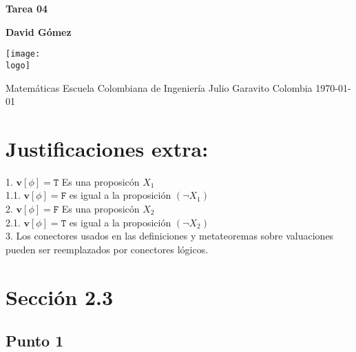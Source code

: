 \documentclass{article}
\newcommand{\logo}{C:/Users/usuario/Documents/U/logo-eci.jpg}
\newcommand{\val}[2]{\mathbf{#1}[#2]}
\begin{document}

\begin{titlepage}
	\begin{center}
		\vspace*{1cm}

		\textbf{\Huge{Tarea 04}}

		\vspace{1.5cm}

		\textbf{\large{David Gómez}}

		\vspace{4cm}

		\texttt{[image: \\logo]}

		\vspace{5cm}

		Matemáticas\linebreak
		Escuela Colombiana de Ingeniería Julio Garavito\linebreak
		Colombia\linebreak
		\today

	\end{center}
\end{titlepage}
\clearpage
\tableofcontents
\clearpage

\section{Justificaciones extra: }

\begin{tcolorbox}[demo, title = Metateorema SS]
    \vspace*{1cm}
    1. $\val{v}{\phi} = \mathtt{T}$ Es una proposicón $X_1$\\[3pt]
        1.1. $\val{v}{\phi} = \mathtt{F}$ es igual a la proposición $(\neg X_1)$\\[3pt]
    2. $\val{v}{\phi} = \mathtt{F}$ Es una proposicón $X_2$\\[3pt]
        2.1. $\val{v}{\phi} = \mathtt{T}$ es igual a la proposición $(\neg X_2)$\\[3pt]
    3. Los conectores usados en las definiciones y metateoremas sobre valuaciones pueden ser reemplazados  por conectores lógicos.
\end{tcolorbox}
\section{Sección 2.3}

\subsection{Punto 1}
\end{document}
